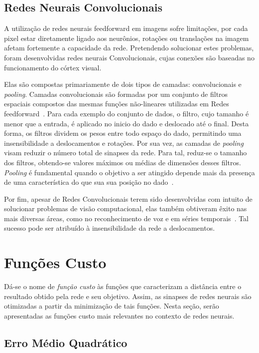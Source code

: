 \subsection{Redes Neurais Convolucionais} \label{sec:convolucionais}

A utilização de redes neurais feedforward em imagens sofre limitações, por cada pixel estar diretamente ligado aos neurônios, rotações ou translações na imagem afetam fortemente a capacidade da rede. Pretendendo solucionar estes problemas, foram desenvolvidas redes neurais Convolucionais, cujas conexões são baseadas no funcionamento do córtex visual.

Elas são compostas primariamente de dois tipos de camadas: convolucionais e \textit{pooling}. Camadas convolucionais são formadas por um conjunto de filtros espaciais compostos das mesmas funções não-lineares utilizadas em Redes feedforward~\cite{goodfellow16}. Para cada exemplo do conjunto de dados, o filtro, cujo tamanho é menor que a entrada, é aplicado no inicio do dado e deslocado até o final. Desta forma, os filtros dividem os pesos entre todo espaço do dado, permitindo uma insensibilidade a deslocamentos e rotações. Por sua vez, as camadas de \textit{pooling} visam reduzir o número total de sinapses da rede. Para tal, reduz-se o tamanho dos filtros, obtendo-se valores máximos ou médias de dimensões desses filtros. \textit{Pooling} é fundamental quando o objetivo a ser atingido depende mais da presença de uma característica do que sua sua posição no dado~\cite{goodfellow16}.

Por fim, apesar de Redes Convolucionais terem sido desenvolvidas com intuito de solucionar problemas de visão computacional, elas também obtiveram êxito nas mais diversas áreas, como no reconhecimento de voz e em séries temporais~\cite{lecun95}. Tal sucesso pode ser atribuído à insensibilidade da rede a deslocamentos.

\section{Funções Custo} \label{sec:custo}

Dá-se o nome de \textit{função custo} às funções que caracterizam a distância entre o resultado obtido pela rede e seu objetivo. Assim, as sinapses de redes neurais são otimizadas a partir da minimização de tais funções. Nesta seção, serão apresentadas as funções custo mais relevantes no contexto de redes neurais.

\subsection{Erro Médio Quadrático}

